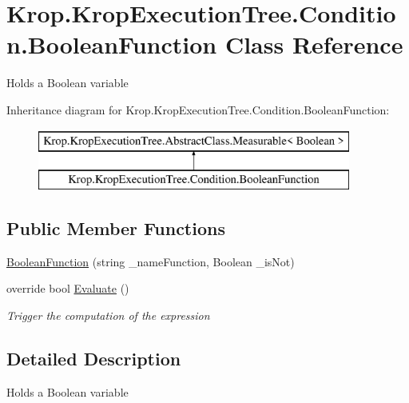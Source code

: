\hypertarget{class_krop_1_1_krop_execution_tree_1_1_condition_1_1_boolean_function}{}\section{Krop.\+Krop\+Execution\+Tree.\+Condition.\+Boolean\+Function Class Reference}
\label{class_krop_1_1_krop_execution_tree_1_1_condition_1_1_boolean_function}


Holds a Boolean variable  


Inheritance diagram for Krop.\+Krop\+Execution\+Tree.\+Condition.\+Boolean\+Function\+:\begin{figure}[H]
\begin{center}
\leavevmode
\includegraphics[height=2.000000cm]{class_krop_1_1_krop_execution_tree_1_1_condition_1_1_boolean_function}
\end{center}
\end{figure}
\subsection*{Public Member Functions}
\begin{DoxyCompactItemize}
\item 
\mbox{\hyperlink{class_krop_1_1_krop_execution_tree_1_1_condition_1_1_boolean_function_aaa2dc5cd14ba857edb9afaf22503d612}{Boolean\+Function}} (string \+\_\+name\+Function, Boolean \+\_\+is\+Not)
\item 
override bool \mbox{\hyperlink{class_krop_1_1_krop_execution_tree_1_1_condition_1_1_boolean_function_a1e274ef1079b4ab8136c45b5f48c747e}{Evaluate}} ()
\begin{DoxyCompactList}\small\item\em Trigger the computation of the expression \end{DoxyCompactList}\end{DoxyCompactItemize}


\subsection{Detailed Description}
Holds a Boolean variable 



